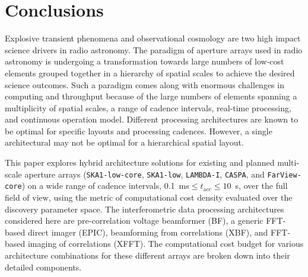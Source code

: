 \documentclass[
  journal=pasa,
  manuscript=article-type,
  year=2020,
  volume=37,
]{cup-journal}
\begin{document}






\section{Conclusions} \label{sec:conclusion}

Explosive transient phenomena and observational cosmology are two high impact science drivers in radio astronomy. The paradigm of aperture arrays used in radio astronomy is undergoing a transformation towards large numbers of low-cost elements grouped together in a hierarchy of spatial scales to achieve the desired science outcomes. Such a paradigm comes along with enormous challenges in computing and throughput because of the large numbers of elements spanning a multiplicity of spatial scales, a range of cadence intervals, real-time processing, and continuous operation model. Different processing architectures are known to be optimal for specific layouts and processing cadences. However, a single architectural may not be optimal for a hierarchical spatial layout.

This paper explores hybrid architecture solutions for existing and planned multi-scale aperture arrays (\texttt{SKA1-low-core}, \texttt{SKA1-low}, \texttt{LAMBDA-I}, \texttt{CASPA}, and \texttt{FarView-core}) on a wide range of cadence intervals, 0.1~ms$\le t_\textrm{acc} \le 10$~s, over the full field of view, using the metric of computational cost density evaluated over the discovery parameter space. The interferometric data processing architectures considered here are pre-correlation voltage beamformer (BF), a generic FFT-based direct imager (EPIC), beamforming from correlations (XBF), and FFT-based imaging of correlations (XFFT). The computational cost budget for various architecture combinations for these different arrays are broken down into their detailed components. 
\end{document}
